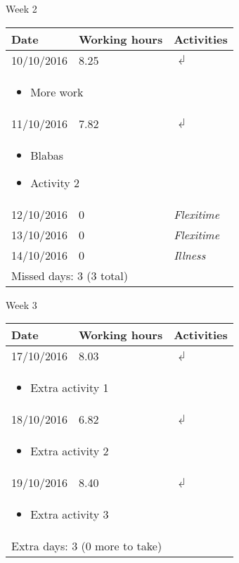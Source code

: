 \begin{table}[!ht]
Week 2
\begin{center}
\begin{tabular}{llp{6cm}}
\toprule
Date & Working hours & Activities\\ 
\midrule 
10/10/2016 & 8.25 & $\dlsh$ \\ 
\multicolumn{3}{l}{\parbox{135mm}{%
\begin{itemize} 
\item More work
\end{itemize}}} \\ 
11/10/2016 & 7.82 & $\dlsh$ \\ 
\multicolumn{3}{l}{\parbox{135mm}{%
\begin{itemize} 
\item Blabas
\item Activity 2
\end{itemize}}} \\ 
12/10/2016 & 0 & \textit{Flexitime} \\ 
13/10/2016 & 0 & \textit{Flexitime} \\ 
14/10/2016 & 0 & \textit{Illness} \\ 
\midrule 
\multicolumn{3}{l}{Missed days: 3 (3 total)} \\ 
\bottomrule 
\end{tabular} 
\end{center} 
\end{table} 



\begin{table}[!ht]
Week 3
\begin{center}
\begin{tabular}{llp{6cm}}
\toprule
Date & Working hours & Activities\\ 
\midrule 
17/10/2016 & 8.03 & $\dlsh$ \\ 
\multicolumn{3}{l}{\parbox{135mm}{%
\begin{itemize} 
\item Extra activity 1
\end{itemize}}} \\ 
18/10/2016 & 6.82 & $\dlsh$ \\ 
\multicolumn{3}{l}{\parbox{135mm}{%
\begin{itemize} 
\item Extra activity 2
\end{itemize}}} \\ 
19/10/2016 & 8.40 & $\dlsh$ \\ 
\multicolumn{3}{l}{\parbox{135mm}{%
\begin{itemize} 
\item Extra activity 3
\end{itemize}}} \\ 
\midrule 
\multicolumn{3}{l}{Extra days: 3 (0 more to take)} \\ 
\bottomrule 
\end{tabular} 
\end{center} 
\end{table} 



